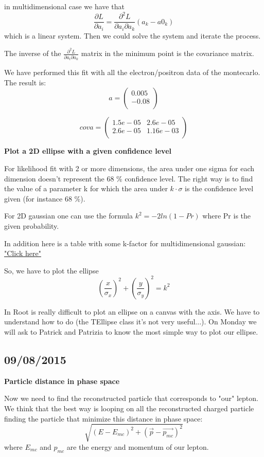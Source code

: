 in multidimensional case we have that 
\[ \frac{\partial L}{\partial a_i} = \frac{\partial ^2 L}{\partial a_i \partial a_k} (a_k - a0_k)\]
which is a linear system. Then we could solve the system and iterate the process.

The inverse of the $\frac{\partial^2 L}{\partial a_i \partial a_k}$ matrix in the minimum point is the covariance matrix.

We have performed this fit with all the electron/positron data of the montecarlo. The result is:
\[ 
a=\left(
\begin{array}{c}
0.005\\
-0.08\\
\end{array} 
\right)
\]

\[
cova=\left(
\begin{array}{cc}
1.5e-05 & 2.6e-05\\
2.6e-05 & 1.16e-03\\
\end{array}
\right)
\]

\textbf{Plot a 2D ellipse with a given confidence level}

For likelihood fit with 2 or more dimensions, the area under one sigma for each dimension doesn't represent the 68 \% confidence level. The right way is to find the value of a parameter k for which the area under $k \cdot \sigma$ is the confidence level given (for instance 68 \%).

For 2D gaussian one can use the formula $k^2=-2 ln(1-Pr)$ where Pr is the given probability.

In addition here is a table with some k-factor for multidimensional gaussian: \href{https://people.richland.edu/james/lecture/m170/tbl-chi.html}{"Click here"}

So, we have to plot the ellipse \[\left(\frac{x}{\sigma_x}\right)^2 + \left(\frac{y}{\sigma_y}\right)^2 = k^2 \]

In Root is really difficult to plot an ellipse on a canvas with the axis. We have to understand how to do (the TEllipse class it's not very useful...). On Monday we will ask to Patrick and Patrizia to know the most simple way to plot our ellipse.

\subsection{09/08/2015}

\textbf{Particle distance in phase space}

Now we need to find the reconstructed particle that corresponds to "our" lepton. We think that the best way is looping on all the reconstructed charged particle finding the particle that minimize this distance in phase space:
\[ \sqrt{(E-E_{mc})^2 + (\vec{p}-\vec{p_{mc}})^2}\]
where $E_{mc}$ and $p_{mc}$ are the energy and momentum of our lepton.

